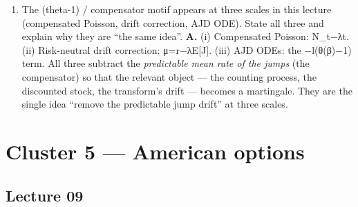 \documentclass[
  11pt,
]{article}
\begin{document}
\begin{enumerate}
  recovered as the degenerate AJD. Adding l\_0(θ(iu)−1) reproduces the
  Merton cf.
\item
  The (theta-1) / compensator motif appears at three scales in this
  lecture (compensated Poisson, drift correction, AJD ODE). State all
  three and explain why they are ``the same idea''. \textbf{A.} (i)
  Compensated Poisson: N\_t−λt. (ii) Risk-neutral drift correction:
  μ=r−λE{[}J{]}. (iii) AJD ODEs: the −l(θ(β)−1) term. All three subtract
  the \emph{predictable mean rate of the jumps} (the compensator) so
  that the relevant object --- the counting process, the discounted
  stock, the transform's drift --- becomes a martingale. They are the
  single idea ``remove the predictable jump drift'' at three scales.
\end{enumerate}

\hypertarget{cluster-5-american-options}{%
\section{Cluster 5 --- American
options}\label{cluster-5-american-options}}

\hypertarget{lecture-09}{%
\subsection{Lecture 09}\label{lecture-09}}
\end{document}
